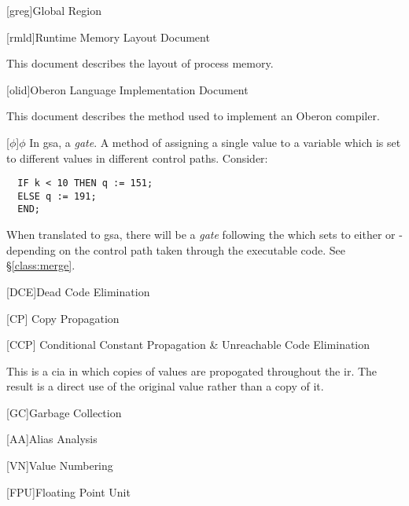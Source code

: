 \begin{acronym}
  [greg]{Global Region}

  [rmld]{Runtime Memory Layout Document}

  This document describes the layout of process memory.

  [olid]{Oberon Language Implementation Document}

  This document describes the method used to implement an Oberon compiler.

  [$\phi$]{$\phi$}
  In \ac{gsa}, a \emph{gate}.  A method of assigning a single value to
  a variable which is set to different values in different control
  paths.  Consider:

\begin{verbatim}
  IF k < 10 THEN q := 151;
  ELSE q := 191;
  END;
\end{verbatim}

  When translated to \ac{gsa}, there will be a \emph{gate} following
  the  which sets  to either  or
   - depending on the control path taken through the
  executable code.  See \S\ref{class:merge}.

  [DCE]{Dead Code Elimination}

  [CP] {Copy Propagation}

  [CCP] {Conditional Constant Propagation \& Unreachable
  Code Elimination}

  This is a \ac{cia} in which copies of values are propogated
  throughout the \ac{ir}.  The result is a direct use of the original
  value rather than a copy of it.

  [GC]{Garbage Collection}

  [AA]{Alias Analysis}

  [VN]{Value Numbering}

  [FPU]{Floating Point Unit}
\end{acronym}
